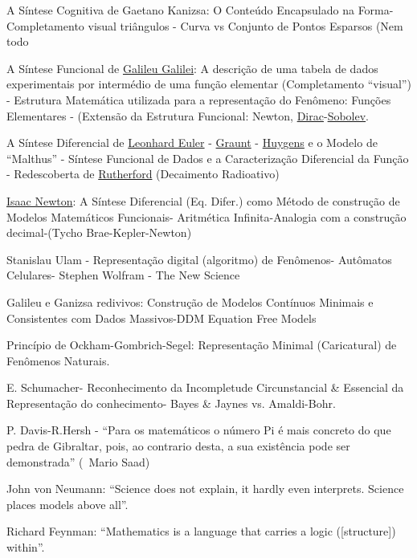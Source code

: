     A Síntese Cognitiva de Gaetano Kanizsa: O Conteúdo Encapsulado na Forma-Completamento visual triângulos - Curva vs Conjunto de Pontos Esparsos (Nem todo

    A Síntese Funcional de \href{https://pt.wikipedia.org/wiki/Galileu_Galilei}{Galileu Galilei}: A descrição de uma tabela de dados experimentais por intermédio de uma função elementar (Completamento ``visual'') - Estrutura Matemática utilizada para a representação do Fenômeno: Funções Elementares - (Extensão da Estrutura Funcional: Newton, \href{https://pt.wikipedia.org/wiki/Paul_Dirac}{Dirac}-\href{https://pt.wikipedia.org/wiki/Sergei_Sobolev}{Sobolev}.

    A Síntese Diferencial de \href{https://pt.wikipedia.org/wiki/Leonhard_Euler}{Leonhard Euler} - \href{https://pt.wikipedia.org/wiki/John_Graunt}{Graunt} - \href{https://pt.wikipedia.org/wiki/Christiaan_Huygens}{Huygens} e o Modelo de ``Malthus'' - Síntese Funcional de Dados e a Caracterização Diferencial da Função - Redescoberta de \href{https://pt.wikipedia.org/wiki/Ernest_Rutherford}{Rutherford} (Decaimento Radioativo)

    \href{https://pt.wikipedia.org/wiki/Isaac_Newton}{Isaac Newton}: A Síntese Diferencial (Eq. Difer.) como Método de construção de Modelos Matemáticos Funcionais- Aritmética Infinita-Analogia com a construção decimal-(Tycho Brae-Kepler-Newton)

    Stanislau Ulam - Representação digital (algoritmo) de Fenômenos- Autômatos Celulares- Stephen Wolfram - The New Science

    Galileu e Ganizsa redivivos: Construção de Modelos Contínuos Minimais e Consistentes com Dados Massivos-DDM Equation Free Models
    
    Princípio de Ockham-Gombrich-Segel: Representação Minimal (Caricatural) de Fenômenos Naturais.

    E. Schumacher- Reconhecimento da Incompletude Circunstancial \& Essencial da Representação do conhecimento- Bayes \& Jaynes vs. Amaldi-Bohr.

    P. Davis-R.Hersh - ``Para os matemáticos o número Pi é mais concreto do que pedra de Gibraltar, pois, ao contrario desta, a sua existência pode ser demonstrada'' (~Mario Saad)

    John von Neumann: ``Science does not explain, it hardly even interprets. Science places models above all''.

    Richard Feynman: ``Mathematics is a language that carries a logic ([structure]) within''.

